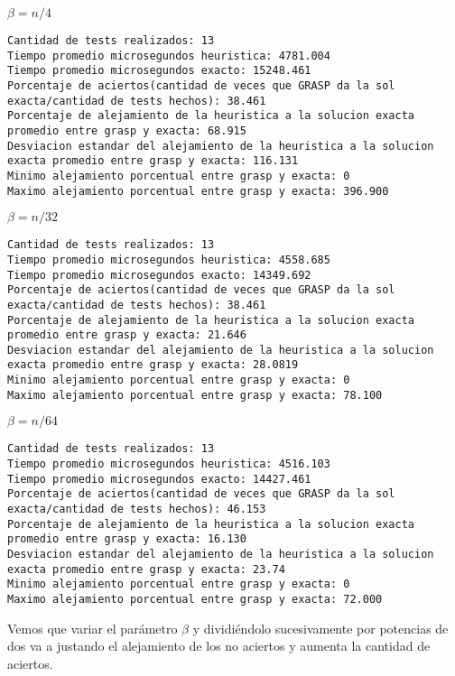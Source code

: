 $\beta= n/4$
\begin{lstlisting}[frame=single]
Cantidad de tests realizados: 13
Tiempo promedio microsegundos heuristica: 4781.004
Tiempo promedio microsegundos exacto: 15248.461
Porcentaje de aciertos(cantidad de veces que GRASP da la sol exacta/cantidad de tests hechos): 38.461
Porcentaje de alejamiento de la heuristica a la solucion exacta promedio entre grasp y exacta: 68.915
Desviacion estandar del alejamiento de la heuristica a la solucion exacta promedio entre grasp y exacta: 116.131
Minimo alejamiento porcentual entre grasp y exacta: 0
Maximo alejamiento porcentual entre grasp y exacta: 396.900
\end{lstlisting}
$\beta=n/32$
\begin{lstlisting}[frame=single]
Cantidad de tests realizados: 13
Tiempo promedio microsegundos heuristica: 4558.685
Tiempo promedio microsegundos exacto: 14349.692
Porcentaje de aciertos(cantidad de veces que GRASP da la sol exacta/cantidad de tests hechos): 38.461
Porcentaje de alejamiento de la heuristica a la solucion exacta promedio entre grasp y exacta: 21.646
Desviacion estandar del alejamiento de la heuristica a la solucion exacta promedio entre grasp y exacta: 28.0819
Minimo alejamiento porcentual entre grasp y exacta: 0
Maximo alejamiento porcentual entre grasp y exacta: 78.100
\end{lstlisting}
$\beta=n/64$
\begin{lstlisting}[frame=single]
Cantidad de tests realizados: 13
Tiempo promedio microsegundos heuristica: 4516.103
Tiempo promedio microsegundos exacto: 14427.461
Porcentaje de aciertos(cantidad de veces que GRASP da la sol exacta/cantidad de tests hechos): 46.153
Porcentaje de alejamiento de la heuristica a la solucion exacta promedio entre grasp y exacta: 16.130
Desviacion estandar del alejamiento de la heuristica a la solucion exacta promedio entre grasp y exacta: 23.74
Minimo alejamiento porcentual entre grasp y exacta: 0
Maximo alejamiento porcentual entre grasp y exacta: 72.000
\end{lstlisting}

Vemos que variar el par\'ametro $\beta$ y dividi\'endolo sucesivamente por potencias de dos va a justando el alejamiento de los no aciertos y aumenta la cantidad de aciertos.

\vspace{2mm}


